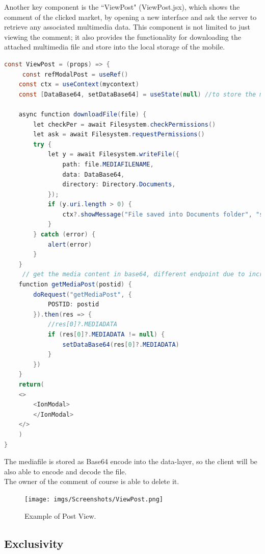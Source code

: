 \documentclass[conference]{IEEEtran}
\begin{document}
Another key component is the ``ViewPost" (ViewPost.jsx), which shows the comment of the clicked market, by opening a new interface and ask the server to retrieve any associated multimedia data.
This component is not limited to just viewing the comment; it also provides the functionality for downloading the attached multimedia file and store into the local storage of the mobile.


\begin{lstlisting}[language=Java, caption=ViewPost]
const ViewPost = (props) => {
     const refModalPost = useRef()
    const ctx = useContext(mycontext)
    const [DataBase64, setDataBase64] = useState(null) //to store the mediafile attached

    async function downloadFile(file) {
        let checkPer = await Filesystem.checkPermissions()
        let ask = await Filesystem.requestPermissions()
        try {
            let y = await Filesystem.writeFile({
                path: file.MEDIAFILENAME,
                data: DataBase64,
                directory: Directory.Documents,
            });
            if (y.uri.length > 0) {
                ctx?.showMessage("File saved into Documents folder", "success")
            }
        } catch (error) {
            alert(error)
        }
    }
     // get the media content in base64, different endpoint due to increment performance
    function getMediaPost(postid) {
        doRequest("getMediaPost", {
            POSTID: postid
        }).then(res => {
            //res[0]?.MEDIADATA
            if (res[0]?.MEDIADATA != null) {
                setDataBase64(res[0]?.MEDIADATA)
            }
        })
    }
    return(
    <>
        <IonModal>
        </IonModal>
    </>
    )
}
\end{lstlisting}

The mediafile is stored as Base64 encode into the data-layer, so the client will be also able to encode and decode the file.
\\
The owner of the comment of course is able to delete it.

\begin{figure}[htbp]
\begin{center}
{\texttt{[image: imgs/Screenshots/ViewPost.png]}}
\end{center}
\caption{Example of Post View.}
\label{fig}
\end{figure}

\subsection{Exclusivity}
\end{document}
